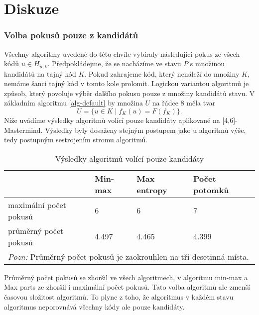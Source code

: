 
\section{Diskuze}
\subsubsection{Volba pokusů pouze z kandidátů}
Všechny algoritmy uvedené do této chvíle vybíraly následující pokus ze všech kódů $u\in H_{n,k}$. Předpokládejme, že se nacházíme ve stavu $P$ s množinou kandidátů na tajný kód $K$. Pokud zahrajeme kód, který nenáleží do množiny $K$, nemáme šanci tajný kód v tomto kole prolomit. Logickou variantou algoritmů je způsob, který povoluje výběr dalšího pokusu pouze z množiny kandidátů stavu. V základním algoritmu \ref{alg-default} by množina $U$ na řádce $8$ měla tvar
\[U = \{u \in K \mid f_K(u) = F(f_K)\}.\]
Níže uvádíme výsledky algoritmů volící pouze kandidáty aplikované na [4,6]-Mastermind. Výsledky byly dosaženy stejným postupem jako u algoritmů výše, tedy postupným sestrojením stromu algoritmů. 

\begin{table}[h]
\centering
\begin{tabular}{l l l l}
\toprule
 & Min-max & Max entropy & Počet potomků  \\
\midrule

maximální počet pokusů 
& 6 & 6 & 7  \\

průměrný počet pokusů 
& 4.497 & 4.465 & 4.399 \\
\bottomrule
\multicolumn{4}{l}{\footnotesize \textit{Pozn:}
Průměrný počet pokusů je zaokrouhlen na tři desetinná místa.}
\end{tabular}
\caption{Výsledky algoritmů volící pouze kandidáty}\label{tabpouzekandidati}
\end{table}

Průměrný počet pokusů se zhoršil ve všech algoritmech, v algoritmu min-max a Max parts ze zhoršil i maximální počet pokusů. Tato volba algoritmů ale zmenší časovou složitost algoritmů. To plyne z toho, že algoritmus v každém stavu algoritmus neporovnává všechny kódy ale pouze kandidáty. 


